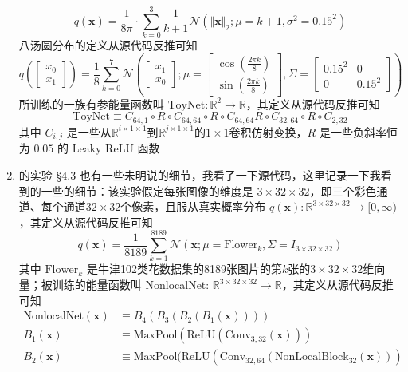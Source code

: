 \documentclass[11pt]{article}
\begin{document}
\begin{enumerate}
\begin{equation}
q(\mathbf{x})=\frac{1}{8\pi}\cdot\sum_{k=0}^3\frac{1}{k+1}\mathcal{N}\left(\Vert\mathbf{x}\Vert_2;\mu=k+1,\sigma^2=0.15^2\right)
\end{equation}八汤圆分布的定义从源代码反推可知\begin{equation}\label{batangyuan}
q(\begin{bmatrix}x_0\\x_1\end{bmatrix})=\frac{1}{8}\sum_{k=0}^7\mathcal{N}\left(\begin{bmatrix}x_1\\x_0\end{bmatrix};\mu=\begin{bmatrix}\cos(\frac{2\pi k}{8})\\\sin(\frac{2\pi k}{8})\end{bmatrix},\Sigma=\begin{bmatrix}0.15^2&0\\0&0.15^2\end{bmatrix}\right)
\end{equation}所训练的一族有参能量函数叫 $\text{ToyNet}:\mathbb{R}^2\to\mathbb{R}$，其定义从源代码反推可知\[
\text{ToyNet}\equiv C_{64,1}\circ R\circ C_{64,64}\circ R\circ C_{64,64}R\circ C_{32,64}\circ R\circ C_{2,32}
\]其中 $C_{i,j}$ 是一些从$\mathbb{R}^{i\times1\times1}$到$\mathbb{R}^{j\times1\times1}$的$1\times1$卷积仿射变换，$R$ 是一些负斜率恒为 $0.05$ 的 Leaky ReLU 函数
\item \cite{nijkamp2019anatomy} 的实验 \S4.3 也有一些未明说的细节，我看了一下源代码，这里记录一下我看到的一些的细节：该实验假定每张图像的维度是 $3\times32\times32$，即三个彩色通道、每个通道$32\times32$个像素，且服从真实概率分布 $q(\mathbf{x}): \mathbb{R}^{3\times32\times32}\to[0,\infty)$，其定义从源代码反推可知\begin{equation}\label{oxford102flowers}
q(\mathbf{x})=\frac{1}{8189}\sum_{k=1}^{8189}\mathcal{N}\left(\mathbf{x};\mu=\text{Flower}_k,\Sigma=I_{3\times32\times32}\right)
\end{equation}其中 $\text{Flower}_k$ 是牛津102类花数据集的8189张图片的第$k$张的$3\times32\times32$维向量；被训练的能量函数叫 NonlocalNet: $\mathbb{R}^{3\times32\times32}\to\mathbb{R}$，其定义从源代码反推可知\[
\begin{split}
\text{NonlocalNet}(\mathbf{x})&\equiv B_4(B_3(B_2(B_1(\mathbf{x}))))\\
B_1(\mathbf{x})&\equiv \text{MaxPool}(\text{ReLU}(\text{Conv}_{3,32}(\mathbf{x})))\\
B_2(\mathbf{x})&\equiv \text{MaxPool}(\text{ReLU}(\text{Conv}_{32,64}(\text{NonLocalBlock}_{32}(\mathbf{x})))\\

\end{split}\]
\end{enumerate}
\end{document}
